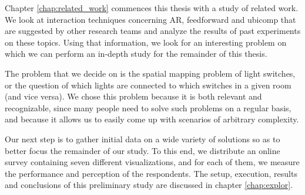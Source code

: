 Chapter \ref{chap:related_work} commences this thesis with a study of related work. We look at interaction techniques concerning AR, feedforward and ubicomp that are suggested by other research teams and analyze the results of past experiments on these topics. Using that information, we look for an interesting problem on which we can perform an in-depth study for the remainder of this thesis.

The problem that we decide on is the spatial mapping problem of light switches, or the question of which lights are connected to which switches in a given room (and vice versa). We chose this problem because it is both relevant and recognizable, since many people need to solve such problems on a regular basis, and because it allows us to easily come up with scenarios of arbitrary complexity.

Our next step is to gather initial data on a wide variety of solutions so as to better focus the remainder of our study. To this end, we distribute an online survey containing seven different visualizations, and for each of them, we measure the performance and perception of the respondents. The setup, execution, results and conclusions of this preliminary study are discussed in chapter \ref{chap:explor}.




